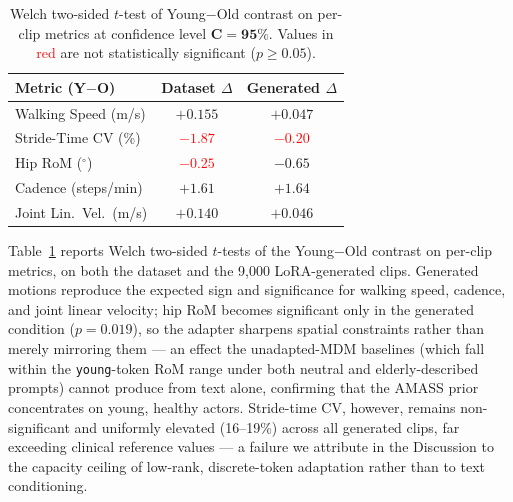 \begin{table}[H]
\centering
\footnotesize
\caption{Welch two-sided $t$-test of Young$-$Old contrast on per-clip metrics at confidence level $\mathbf{C=95\%}$. Values in \textcolor{red}{red} are not statistically significant ($p\!\geq\!0.05$).}
\label{tab:welch}
\setlength{\tabcolsep}{6pt}
\begin{tabular}{lcc}
\toprule
\textbf{Metric (Y$-$O)} & \textbf{Dataset} $\Delta$ & \textbf{Generated} $\Delta$ \\
\midrule
Walking Speed (m/s)     & $+0.155$ & $+0.047$ \\
Stride-Time CV (\%)     & \textcolor{red}{$-1.87$} & \textcolor{red}{$-0.20$} \\
Hip RoM ($^\circ$)      & \textcolor{red}{$-0.25$} & $-0.65$ \\
Cadence (steps/min)     & $+1.61$ & $+1.64$ \\
Joint Lin.\ Vel.\ (m/s) & $+0.140$ & $+0.046$ \\
\bottomrule
\end{tabular}
\end{table}

Table~\ref{tab:welch} reports Welch two-sided $t$-tests of the Young$-$Old contrast on per-clip metrics, on both the dataset and the 9{,}000 LoRA-generated clips. Generated motions reproduce the expected sign and significance for walking speed, cadence, and joint linear velocity; hip RoM becomes significant only in the generated condition ($p\!=\!0.019$), so the adapter sharpens spatial constraints rather than merely mirroring them --- an effect the unadapted-MDM baselines (which fall within the \texttt{young}-token RoM range under both neutral and elderly-described prompts) cannot produce from text alone, confirming that the AMASS prior concentrates on young, healthy actors. Stride-time CV, however, remains non-significant and uniformly elevated (16--19\%) across all generated clips, far exceeding clinical reference values --- a failure we attribute in the Discussion to the capacity ceiling of low-rank, discrete-token adaptation rather than to text conditioning.
